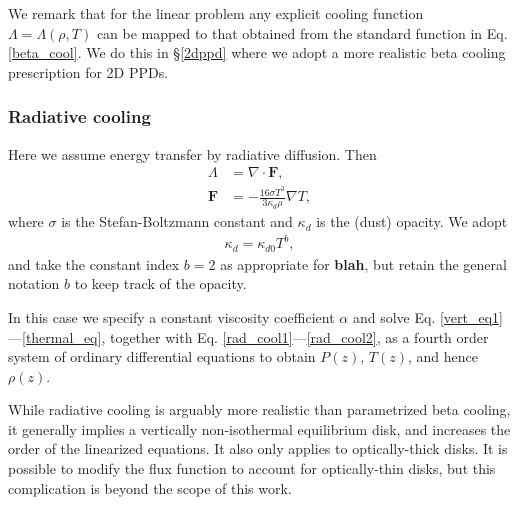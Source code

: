 We remark that for the linear problem  
any explicit cooling function $\Lambda=\Lambda(\rho,T)$ can be
mapped to that obtained from the standard function in Eq.
\ref{beta_cool}. We do this in \S\ref{2dppd} where we adopt a more
realistic beta cooling prescription for 2D PPDs.  

\subsubsection{Radiative cooling}\label{rad_cool}
Here we assume energy transfer by radiative diffusion. Then
\begin{align}
  \Lambda &= \nabla\cdot\bm{F},\label{rad_cool1}\\
  \bm{F}   &= -\frac{16\sigma T^3}{3\kappa_d\rho}\nabla T, \label{rad_cool2}
\end{align}
where $\sigma$ is the Stefan-Boltzmann constant and 
$\kappa_d$ is the (dust) opacity. We adopt
\begin{align}\label{opacity_law}
  \kappa_d = \kappa_{d0}T^b,
\end{align}
and take the constant index $b=2$ as appropriate for {\bf blah},
but retain the general notation $b$ to keep track of the opacity.   

In this case we specify a constant viscosity coefficient $\alpha$ and
solve Eq. \ref{vert_eq1}---\ref{thermal_eq}, together with
Eq. \ref{rad_cool1}---\ref{rad_cool2}, as a fourth order system of
ordinary differential equations to obtain $P(z)$, $T(z)$, and hence
$\rho(z)$. 

While radiative cooling is arguably more realistic than
parametrized beta cooling, it generally implies a vertically
non-isothermal equilibrium disk, and increases the order of the
linearized equations. It also only applies to optically-thick 
disks. It is possible to modify the flux function to account for
optically-thin disks, but this complication is beyond the scope of
this work. 


